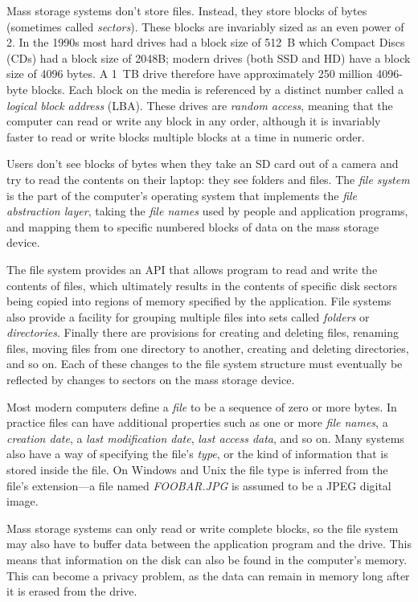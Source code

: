 Mass storage systems don't store files. Instead, they store blocks of
bytes (sometimes called \emph{sectors}). These blocks are invariably
sized as an even power of 2. In the 1990s most hard drives had a block
size of 512~B which Compact Discs (CDs) had a block size of 2048B;
modern drives (both SSD and HD) have a block size of 4096 bytes. A
1~TB drive therefore have approximately 250 million 4096-byte
blocks. Each block on the media is referenced by a distinct number
called a \emph{logical block address} (LBA). These drives are
\emph{random access}, meaning that the computer can read or write any
block in any order, although it is invariably faster to read or write
blocks multiple blocks at a time in numeric order.

Users don't see blocks of bytes when they take an SD card out of a
camera and try to read the contents on their laptop: they see folders
and files. The \emph{file system} is the part of the computer's
operating system that implements the \emph{file abstraction layer},
taking the \emph{file names} used by people and application programs,
and mapping them to specific numbered blocks of data on the mass storage
device.

The file system provides an API that allows program to read and write
the contents of files, which ultimately results in the contents of
specific disk sectors being copied into regions of memory specified by
the application. File systems also provide a facility for grouping
multiple files into sets called \emph{folders} or
\emph{directories}. Finally there are provisions for creating and
deleting files, renaming files, moving files from one directory to
another, creating and deleting directories, and so on. Each of these
changes to the file system structure must eventually be reflected by
changes to sectors on the mass storage device.

Most modern computers define a \emph{file} to be a sequence of zero or more
bytes. In practice files can have additional properties such as one or
more \emph{file names}, a \emph{creation date}, a \emph{last modification date},
\emph{last access data}, and so on. Many systems also have a way of
specifying the file's \emph{type}, or the kind of information that is
stored inside the file. On Windows and Unix the file type is
inferred from the file's extension---a file named
\emph{FOOBAR.JPG} is assumed to be a JPEG digital image.

Mass storage systems can only read or write complete blocks, so the
file system may also have to buffer data between the application
program and the drive. This means that information on the disk can
also be found in the computer's memory. This can become a privacy
problem, as the data can remain in memory long after it is erased from
the drive.


